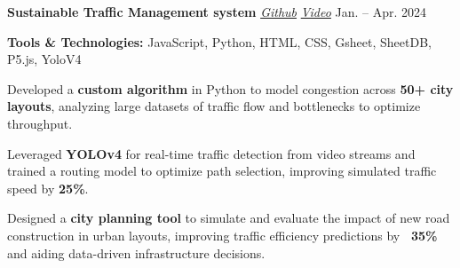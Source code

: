     \resumeProject
      {{\textbf{Sustainable Traffic Management system}} \href{https://github.com/shubhamvermaa/Hack_36?tab=readme-ov-file}{\textit{\small{Github}}} \textbar{} \href{https://youtu.be/P73OS4Aaz14}{\textit{\small{Video}}}}
      {}
      {Jan. – Apr. 2024}
      {}
      \resumeItemListStart
        \item \textbf{Tools \& Technologies:} JavaScript, Python, HTML, CSS, Gsheet, SheetDB, P5.js, YoloV4
        \item Developed a \textbf{custom algorithm} in Python to model congestion across \textbf{50+ city layouts}, analyzing large datasets of traffic flow and bottlenecks to optimize throughput.
        \item Leveraged \textbf{YOLOv4} for real-time traffic detection from video streams and trained a routing model to optimize path selection, improving simulated traffic speed by \textbf{25\%}.
        \item Designed a \textbf{city planning tool} to simulate and evaluate the impact of new road construction in urban layouts, improving traffic efficiency predictions by \textbf{~35\%} and aiding data-driven infrastructure decisions.
      \resumeItemListEnd
\resumeSubHeadingListEnd